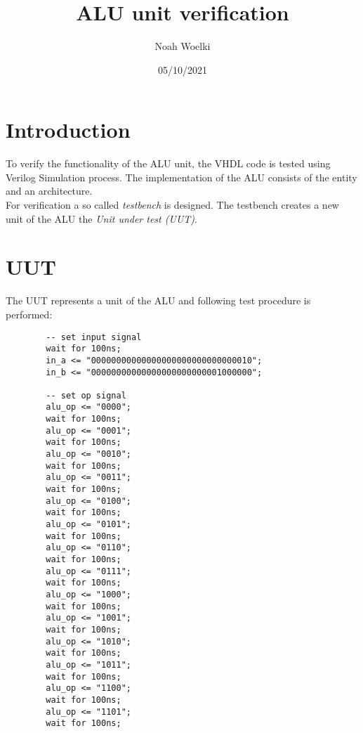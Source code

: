 \documentclass[12pt, a4paper]{article}
\author{Noah Woelki}
\title{ALU unit verification}
\date{05/10/2021}
\begin{document}
\maketitle
\section{Introduction}
To verify the functionality of the ALU unit, the VHDL code is tested using Verilog Simulation process. The implementation of the ALU consists of the entity and an architecture.\\
For verification a so called \textit{testbench} is designed. The testbench creates a new unit of the ALU the \textit{Unit under test (UUT)}.

\section{UUT}
The UUT represents a unit of the ALU and following test procedure is performed:\\

\begin{verbatim}
        -- set input signal
        wait for 100ns;
        in_a <= "00000000000000000000000000000010";
        in_b <= "00000000000000000000000001000000";

        -- set op signal
        alu_op <= "0000";
        wait for 100ns;
        alu_op <= "0001";
        wait for 100ns;
        alu_op <= "0010";
        wait for 100ns;
        alu_op <= "0011";
        wait for 100ns;
        alu_op <= "0100";
        wait for 100ns;
        alu_op <= "0101";
        wait for 100ns;
        alu_op <= "0110";
        wait for 100ns;
        alu_op <= "0111";
        wait for 100ns;
        alu_op <= "1000";
        wait for 100ns;
        alu_op <= "1001";
        wait for 100ns;
        alu_op <= "1010";
        wait for 100ns;
        alu_op <= "1011";
        wait for 100ns;
        alu_op <= "1100";
        wait for 100ns;
        alu_op <= "1101";
        wait for 100ns;
\end{verbatim}
\end{document}
